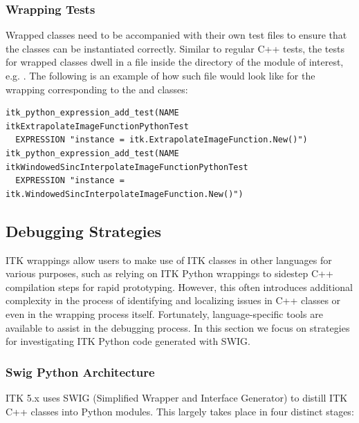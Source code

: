 \subsubsection{Wrapping Tests}

Wrapped classes need to be accompanied with their own test files to ensure that
the classes can be instantiated correctly. Similar to regular C++ tests, the
tests for wrapped classes dwell in a  file inside the
 directory of the module of interest, e.g.
. The
following is an example of how such file would look like for the wrapping
corresponding to the  and
 classes:

\begin{verbatim}
itk_python_expression_add_test(NAME itkExtrapolateImageFunctionPythonTest
  EXPRESSION "instance = itk.ExtrapolateImageFunction.New()")
itk_python_expression_add_test(NAME itkWindowedSincInterpolateImageFunctionPythonTest
  EXPRESSION "instance = itk.WindowedSincInterpolateImageFunction.New()")
\end{verbatim}


\subsection{Debugging Strategies}%
\label{subsec:DebuggingStrategies}

ITK wrappings allow users to make use of ITK classes in other languages for various
purposes, such as relying on ITK Python wrappings to sidestep C++ compilation steps
for rapid prototyping. However, this often introduces additional complexity in the
process of identifying and localizing issues in C++ classes or even in the wrapping
process itself. Fortunately, language-specific tools are available to assist in
the debugging process. In this section we focus on strategies for investigating
ITK Python code generated with SWIG.

\subsubsection{Swig Python Architecture}%
\label{subsubsec:SwigArchitecture}

ITK 5.x uses SWIG (Simplified Wrapper and Interface Generator) to distill ITK C++
classes into Python modules. This largely takes place in four distinct stages:

